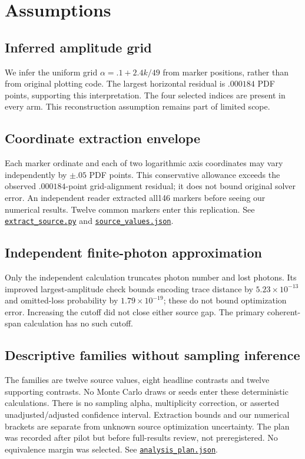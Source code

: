 \documentclass[11pt]{article}
\newcommand{\file}[2]{\href{https://github.com/alectionary/vibe-math/blob/master/formalization/denys-bosonic-pauli/#1}{\nolinkurl{#2}}}
\begin{document}
\section{Assumptions}
\subsection{Inferred amplitude grid}
We infer the uniform grid $\alpha=.1+2.4k/49$ from marker positions, rather than from original plotting code. The largest horizontal residual is $.000184$ PDF points, supporting this interpretation. The four selected indices are present in every arm. This reconstruction assumption remains part of limited scope.
\subsection{Coordinate extraction envelope}
Each marker ordinate and each of two logarithmic axis coordinates may vary independently by $\pm.05$ PDF points. This conservative allowance exceeds the observed $.000184$-point grid-alignment residual; it does not bound original solver error. An independent reader extracted all146 markers before seeing our numerical results. Twelve common markers enter this replication. See \file{extract_source.py}{extract_source.py} and \file{source-evidence/source_values.json}{source_values.json}.
\subsection{Independent finite-photon approximation}
Only the independent calculation truncates photon number and lost photons. Its improved largest-amplitude check bounds encoding trace distance by $5.23\times10^{-13}$ and omitted-loss probability by $1.79\times10^{-19}$; these do not bound optimization error. Increasing the cutoff did not close either source gap. The primary coherent-span calculation has no such cutoff.
\subsection{Descriptive families without sampling inference}
The families are twelve source values, eight headline contrasts and twelve supporting contrasts. No Monte Carlo draws or seeds enter these deterministic calculations. There is no sampling alpha, multiplicity correction, or asserted unadjusted/adjusted confidence interval. Extraction bounds and our numerical brackets are separate from unknown source optimization uncertainty. The plan was recorded after pilot but before full-results review, not preregistered. No equivalence margin was selected. See \file{provenance/analysis_plan.json}{analysis_plan.json}.
\end{document}
